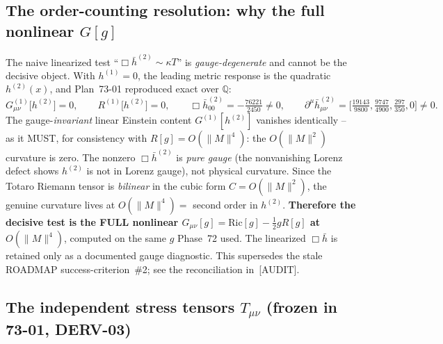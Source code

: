 \subsection{The order-counting resolution: why the full nonlinear $G[g]$}

The naive linearized test ``$\Box\bar h^{(2)}\sim\kappa T$'' is \emph{gauge-degenerate}
and cannot be the decisive object. With $h^{(1)}=0$, the leading metric response is the
quadratic $h^{(2)}(x)$, and Plan~73-01 reproduced exact over $\mathbb{Q}$:
\begin{equation}
  G^{(1)}_{\mu\nu}\big[h^{(2)}\big] = 0,\qquad
  R^{(1)}\big[h^{(2)}\big] = 0,\qquad
  \Box\bar h^{(2)}_{00} = -\tfrac{76221}{2450}\neq 0,\qquad
  \partial^{\mu}\bar h^{(2)}_{\mu\nu}
  = \Big[\tfrac{19143}{9800},\tfrac{9747}{4900},\tfrac{297}{350},0\Big]\neq 0.
  \label{eq:order-anchors}
\end{equation}
The gauge-\emph{invariant} linear Einstein content $G^{(1)}[h^{(2)}]$ vanishes
identically -- as it MUST, for consistency with $R[g]=O(\|M\|^4)$: the $O(\|M\|^2)$
curvature is zero. The nonzero $\Box\bar h^{(2)}$ is \emph{pure gauge} (the nonvanishing
Lorenz defect shows $h^{(2)}$ is not in Lorenz gauge), not physical curvature. Since the
Totaro Riemann tensor is \emph{bilinear} in the cubic form $C=O(\|M\|^2)$, the genuine
curvature lives at $O(\|M\|^4)=$ second order in $h^{(2)}$. \textbf{Therefore the decisive
test is the FULL nonlinear $G_{\mu\nu}[g]=\mathrm{Ric}[g]-\tfrac12 g R[g]$ at
$O(\|M\|^4)$}, computed on the same $g$ Phase~72 used. The linearized $\Box\bar h$ is
retained only as a documented gauge diagnostic. This supersedes the stale ROADMAP
success-criterion~\#2; see the reconciliation in~[AUDIT].

\subsection{The independent stress tensors $T_{\mu\nu}$ (frozen in 73-01, DERV-03)}

